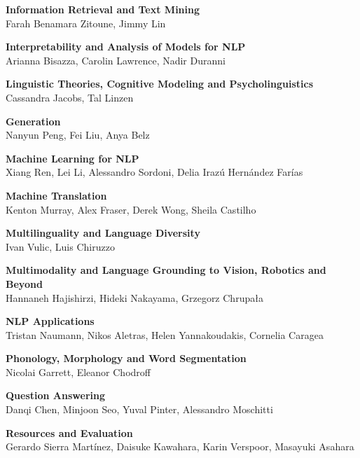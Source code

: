 \textbf{Information Retrieval and Text Mining} \\
\hspace*{0.2in} Farah Benamara Zitoune, Jimmy Lin

\textbf{Interpretability and Analysis of Models for NLP} \\
\hspace*{0.2in} Arianna Bisazza, Carolin Lawrence, Nadir Duranni

\textbf{Linguistic Theories, Cognitive Modeling and Psycholinguistics} \\
\hspace*{0.2in} Cassandra Jacobs, Tal Linzen

\textbf{Generation} \\
\hspace*{0.2in} Nanyun Peng, Fei Liu, Anya Belz

\textbf{Machine Learning for NLP} \\
\hspace*{0.2in} Xiang Ren, Lei Li, Alessandro Sordoni, Delia Iraz\'u Hern\'andez Far\'ias

\textbf{Machine Translation} \\
\hspace*{0.2in} Kenton Murray, Alex Fraser, Derek Wong, Sheila Castilho

\textbf{Multilinguality and Language Diversity} \\
\hspace*{0.2in} Ivan Vulic, Luis Chiruzzo

\textbf{Multimodality and Language Grounding to Vision, Robotics and Beyond} \\
\hspace*{0.2in} Hannaneh Hajishirzi, Hideki Nakayama, Grzegorz Chrupa\l{}a

\textbf{NLP Applications} \\
\hspace*{0.2in} Tristan Naumann, Nikos Aletras, Helen Yannakoudakis, Cornelia Caragea

\textbf{Phonology, Morphology and Word Segmentation} \\
\hspace*{0.2in} Nicolai Garrett, Eleanor Chodroff

\textbf{Question Answering} \\
\hspace*{0.2in} Danqi Chen, Minjoon Seo, Yuval Pinter, Alessandro Moschitti

\textbf{Resources and Evaluation} \\
\hspace*{0.2in} Gerardo Sierra Mart\'inez, Daisuke Kawahara, Karin Verspoor, Masayuki Asahara

